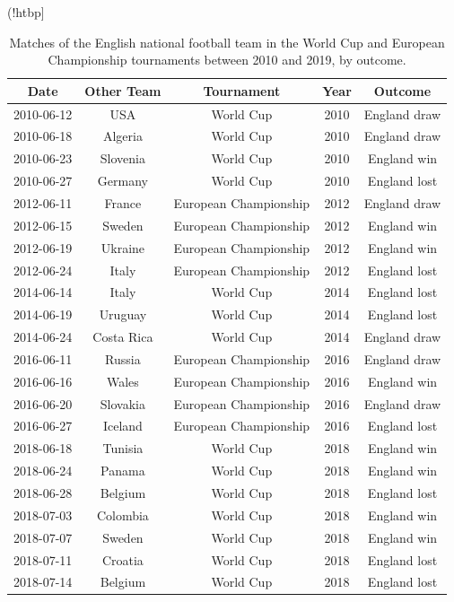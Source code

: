 \documentclass[12pt, a4paper]{article}
\begin{document}
 
 
\begin{table}(!htbp]
\centering
    \caption{Matches of the English national football team in the World Cup and European Championship tournaments between 2010 and 2019, by outcome.}
\begin{tabular}{ccccc}
  \hline
\textbf{Date} & \textbf{Other Team} & \textbf{Tournament} & \textbf{Year} & \textbf{Outcome} \\ 
  \hline
2010-06-12 & USA & World Cup & 2010 & England draw \\ 
  2010-06-18 & Algeria & World Cup & 2010 & England draw \\ 
  2010-06-23 & Slovenia & World Cup & 2010 & England win \\ 
  2010-06-27 & Germany & World Cup & 2010 & England lost \\ 
  2012-06-11 & France & European Championship & 2012 & England draw \\ 
  2012-06-15 & Sweden & European Championship & 2012 & England win \\ 
  2012-06-19 & Ukraine & European Championship & 2012 & England win \\ 
  2012-06-24 & Italy & European Championship & 2012 & England lost \\ 
  2014-06-14 & Italy & World Cup & 2014 & England lost \\ 
  2014-06-19 & Uruguay & World Cup & 2014 & England lost \\ 
  2014-06-24 & Costa Rica & World Cup & 2014 & England draw \\ 
  2016-06-11 & Russia & European Championship & 2016 & England draw \\ 
  2016-06-16 & Wales & European Championship & 2016 & England win \\ 
  2016-06-20 & Slovakia & European Championship & 2016 & England draw \\ 
  2016-06-27 & Iceland & European Championship & 2016 & England lost \\ 
  2018-06-18 & Tunisia & World Cup & 2018 & England win \\ 
  2018-06-24 & Panama & World Cup & 2018 & England win \\ 
  2018-06-28 & Belgium & World Cup & 2018 & England lost \\ 
  2018-07-03 & Colombia & World Cup & 2018 & England win \\ 
  2018-07-07 & Sweden & World Cup & 2018 & England win \\ 
  2018-07-11 & Croatia & World Cup & 2018 & England lost \\ 
  2018-07-14 & Belgium & World Cup & 2018 & England lost \\ 
   \hline
\end{tabular}
  \label{Tab:matches}
\end{table}
\end{document}
